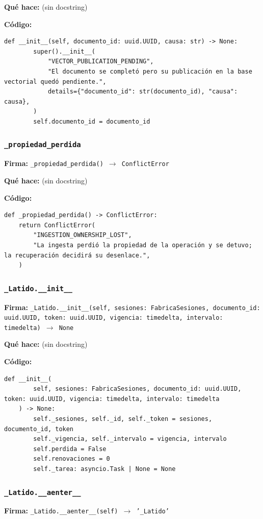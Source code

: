 \documentclass[11pt,a4paper]{article}
\begin{document}
\textbf{Qué hace:} (sin docstring)

\textbf{Código:}
\begin{lstlisting}
def __init__(self, documento_id: uuid.UUID, causa: str) -> None:
        super().__init__(
            "VECTOR_PUBLICATION_PENDING",
            "El documento se completó pero su publicación en la base vectorial quedó pendiente.",
            details={"documento_id": str(documento_id), "causa": causa},
        )
        self.documento_id = documento_id
\end{lstlisting}

\subsubsection*{\texttt{\_propiedad\_perdida}}
\textbf{Firma:} \texttt{\_propiedad\_perdida() $\rightarrow$ ConflictError}

\textbf{Qué hace:} (sin docstring)

\textbf{Código:}
\begin{lstlisting}
def _propiedad_perdida() -> ConflictError:
    return ConflictError(
        "INGESTION_OWNERSHIP_LOST",
        "La ingesta perdió la propiedad de la operación y se detuvo; la recuperación decidirá su desenlace.",
    )
\end{lstlisting}

\subsubsection*{\texttt{\_Latido.\_\_init\_\_}}
\textbf{Firma:} \texttt{\_Latido.\_\_init\_\_(self, sesiones: FabricaSesiones, documento\_id: uuid.UUID, token: uuid.UUID, vigencia: timedelta, intervalo: timedelta) $\rightarrow$ None}

\textbf{Qué hace:} (sin docstring)

\textbf{Código:}
\begin{lstlisting}
def __init__(
        self, sesiones: FabricaSesiones, documento_id: uuid.UUID, token: uuid.UUID, vigencia: timedelta, intervalo: timedelta
    ) -> None:
        self._sesiones, self._id, self._token = sesiones, documento_id, token
        self._vigencia, self._intervalo = vigencia, intervalo
        self.perdida = False
        self.renovaciones = 0
        self._tarea: asyncio.Task | None = None
\end{lstlisting}

\subsubsection*{\texttt{\_Latido.\_\_aenter\_\_}}
\textbf{Firma:} \texttt{\_Latido.\_\_aenter\_\_(self) $\rightarrow$ '\_Latido'}
\end{document}
